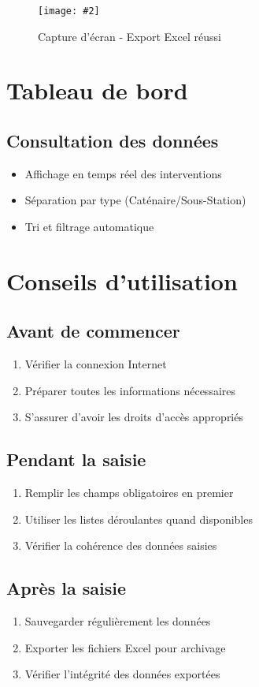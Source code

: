 \documentclass[12pt,a4paper]{report}
\newcommand{\screenshot}[3][]{%
\begin{figure}[H]
\centering
\texttt{[image: \#2]}
\caption{#3}
\end{figure}
}
\begin{document}
\screenshot{export-success.png}{Capture d'écran - Export Excel réussi}

\section{Tableau de bord}

\subsection{Consultation des données}
\begin{itemize}
    \item Affichage en temps réel des interventions
    \item Séparation par type (Caténaire/Sous-Station)
    \item Tri et filtrage automatique
\end{itemize}



\section{Conseils d'utilisation}

\subsection{Avant de commencer}
\begin{enumerate}
    \item Vérifier la connexion Internet
    \item Préparer toutes les informations nécessaires
    \item S'assurer d'avoir les droits d'accès appropriés
\end{enumerate}

\subsection{Pendant la saisie}
\begin{enumerate}
    \item Remplir les champs obligatoires en premier
    \item Utiliser les listes déroulantes quand disponibles
    \item Vérifier la cohérence des données saisies
\end{enumerate}

\subsection{Après la saisie}
\begin{enumerate}
    \item Sauvegarder régulièrement les données
    \item Exporter les fichiers Excel pour archivage
    \item Vérifier l'intégrité des données exportées
\end{enumerate}
\end{document}
